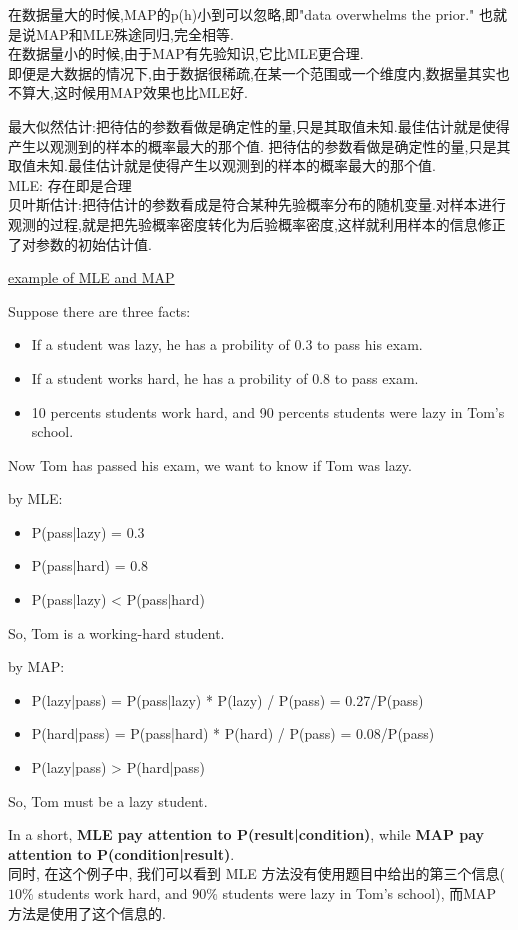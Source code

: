 \documentclass{article}
\begin{document}
在数据量大的时候,MAP的p(h)小到可以忽略,即"data overwhelms the prior." 也就是说MAP和MLE殊途同归,完全相等.\\
在数据量小的时候,由于MAP有先验知识,它比MLE更合理.\\
即便是大数据的情况下,由于数据很稀疏,在某一个范围或一个维度内,数据量其实也不算大,这时候用MAP效果也比MLE好.

\noindent
最大似然估计:把待估的参数看做是确定性的量,只是其取值未知.最佳估计就是使得产生以观测到的样本的概率最大的那个值.
把待估的参数看做是确定性的量,只是其取值未知.最佳估计就是使得产生以观测到的样本的概率最大的那个值.\\
MLE: 存在即是合理\\
贝叶斯估计:把待估计的参数看成是符合某种先验概率分布的随机变量.对样本进行观测的过程,就是把先验概率密度转化为后验概率密度,这样就利用样本的信息修正了对参数的初始估计值.

\begin{example}
\href{http://jimbozhang.blogspot.com/2008/12/difference-between-map-and-mle.html}{example of MLE and MAP}

Suppose there are three facts:
\begin{itemize}
\item If a student was lazy, he has a probility of 0.3 to pass his exam.
\item If a student works hard, he has a probility of 0.8 to pass exam.
\item 10 percents students work hard, and 90 percents students were lazy in Tom's school.
\end{itemize}
Now Tom has passed his exam, we want to know if Tom was lazy.

by MLE:
\begin{itemize}
\item P(pass|lazy) = 0.3
\item P(pass|hard) = 0.8
\item P(pass|lazy) < P(pass|hard)
\end{itemize}
So, Tom is a working-hard student.

by MAP:
\begin{itemize}
\item P(lazy|pass) = P(pass|lazy) * P(lazy) / P(pass) = 0.27/P(pass) 
\item P(hard|pass) = P(pass|hard) * P(hard) / P(pass) = 0.08/P(pass)
\item P(lazy|pass) > P(hard|pass)
\end{itemize}
So, Tom must be a lazy student.

In a short, \textbf{MLE pay attention to P(result|condition)}, while \textbf{MAP pay attention to P(condition|result)}.\\
同时, 在这个例子中, 我们可以看到 
MLE 方法没有使用题目中给出的第三个信息($10\%$ students work hard, and $90\%$ students were lazy in Tom's school), 
而MAP 方法是使用了这个信息的.
\end{example}
\end{document}
